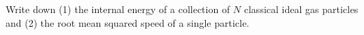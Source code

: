 

\vspace*{\fill}
\centering

Write down (1) the internal energy of a collection of $N$ classical ideal gas particles and (2) the root mean squared speed of a single particle.

\centering
\vspace*{\fill}

